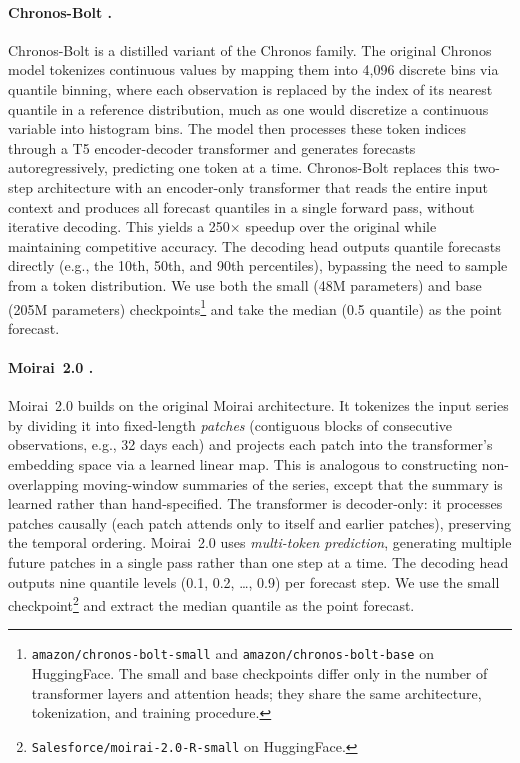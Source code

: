 \documentclass[12pt]{article}
\begin{document}
\paragraph{\textbf{Chronos-Bolt} \citep{ansari2025chronos2}.}
Chronos-Bolt is a distilled variant of the Chronos family. The original Chronos model tokenizes continuous values by mapping them into 4,096 discrete bins via quantile binning, where each observation is replaced by the index of its nearest quantile in a reference distribution, much as one would discretize a continuous variable into histogram bins. The model then processes these token indices through a T5 encoder-decoder transformer and generates forecasts autoregressively, predicting one token at a time. Chronos-Bolt replaces this two-step architecture with an encoder-only transformer that reads the entire input context and produces all forecast quantiles in a single forward pass, without iterative decoding. This yields a 250$\times$ speedup over the original while maintaining competitive accuracy. The decoding head outputs quantile forecasts directly (e.g., the 10th, 50th, and 90th percentiles), bypassing the need to sample from a token distribution. We use both the small (48M parameters) and base (205M parameters) checkpoints\footnote{\texttt{amazon/chronos-bolt-small} and \texttt{amazon/chronos-bolt-base} on HuggingFace. The small and base checkpoints differ only in the number of transformer layers and attention heads; they share the same architecture, tokenization, and training procedure.} and take the median (0.5 quantile) as the point forecast.

\paragraph{\textbf{Moirai~2.0} \citep{liu2025moirai2}.}
Moirai~2.0 builds on the original Moirai architecture. It tokenizes the input series by dividing it into fixed-length \emph{patches} (contiguous blocks of consecutive observations, e.g., 32 days each) and projects each patch into the transformer's embedding space via a learned linear map. This is analogous to constructing non-overlapping moving-window summaries of the series, except that the summary is learned rather than hand-specified. The transformer is decoder-only: it processes patches causally (each patch attends only to itself and earlier patches), preserving the temporal ordering. Moirai~2.0 uses \emph{multi-token prediction}, generating multiple future patches in a single pass rather than one step at a time. The decoding head outputs nine quantile levels (0.1, 0.2, \ldots, 0.9) per forecast step. We use the small checkpoint\footnote{\texttt{Salesforce/moirai-2.0-R-small} on HuggingFace.} and extract the median quantile as the point forecast.
\end{document}

